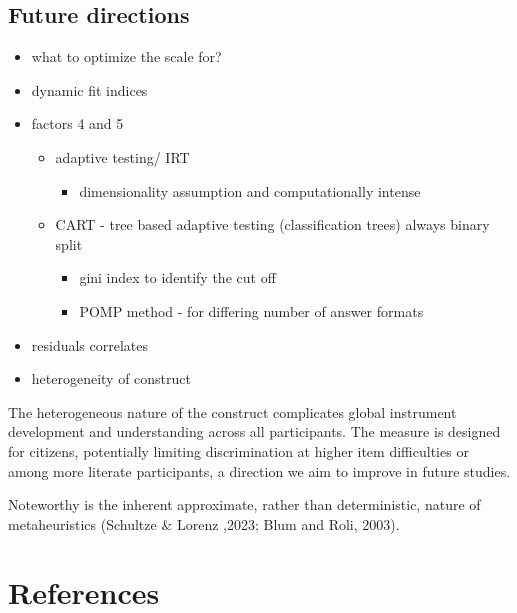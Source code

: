 \documentclass[
  12pt,
  a4paper,
  twoside]{article}
\providecommand{\tightlist}{%
  \setlength{\itemsep}{0pt}\setlength{\parskip}{0pt}}
\begin{document}
\subsection{Future directions}\label{future-directions}

\begin{itemize}
\tightlist
\item
  what to optimize the scale for?
\item
  dynamic fit indices
\item
  factors 4 and 5

  \begin{itemize}
  \tightlist
  \item
    adaptive testing/ IRT

    \begin{itemize}
    \tightlist
    \item
      dimensionality assumption and computationally intense
    \end{itemize}
  \item
    CART - tree based adaptive testing (classification trees) always
    binary split

    \begin{itemize}
    \tightlist
    \item
      gini index to identify the cut off
    \item
      POMP method - for differing number of answer formats
    \end{itemize}
  \end{itemize}
\item
  residuals correlates
\item
  heterogeneity of construct
\end{itemize}

The heterogeneous nature of the construct complicates global instrument
development and understanding across all participants. The measure is
designed for citizens, potentially limiting discrimination at higher
item difficulties or among more literate participants, a direction we
aim to improve in future studies.

Noteworthy is the inherent approximate, rather than deterministic,
nature of metaheuristics (Schultze \& Lorenz ,2023; Blum and Roli,
2003).

\section*{References}\label{references}
\end{document}
